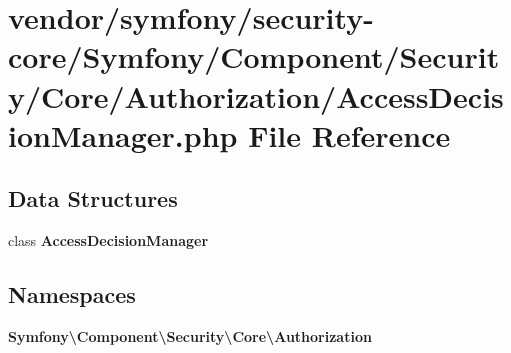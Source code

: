 \section{vendor/symfony/security-\/core/\+Symfony/\+Component/\+Security/\+Core/\+Authorization/\+Access\+Decision\+Manager.php File Reference}
\label{_access_decision_manager_8php}
\subsection*{Data Structures}
\begin{DoxyCompactItemize}
\item 
class {\bf Access\+Decision\+Manager}
\end{DoxyCompactItemize}
\subsection*{Namespaces}
\begin{DoxyCompactItemize}
\item 
 {\bf Symfony\textbackslash{}\+Component\textbackslash{}\+Security\textbackslash{}\+Core\textbackslash{}\+Authorization}
\end{DoxyCompactItemize}
